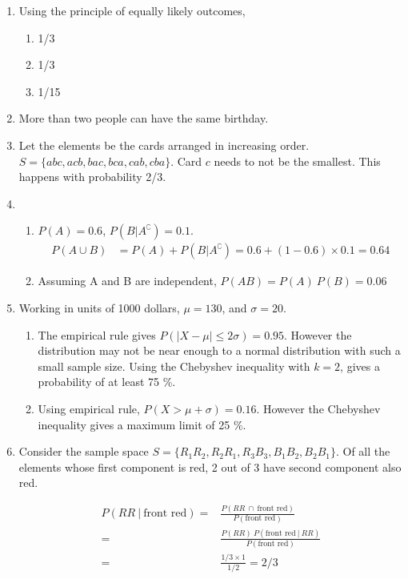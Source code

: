 \begin{enumerate}
	\item Using the principle of equally likely outcomes, 
	\begin{enumerate}
		\item 1/3 
		\item 1/3 
		\item 1/15
	\end{enumerate}
	
	\item More than two people can have the same birthday.
	
	\item Let the elements be the cards arranged in increasing order.
	$ S = \{ abc, acb, bac, bca, cab, cba \} $. Card $ c $ needs to not be the smallest. This happens with probability 2/3.
	
	\item \begin{enumerate}
		\item 	$ P(A) = 0.6 $, $ P(B|A^\complement) = 0.1 $.
		\begin{align}
			P(A \cup B) &= P(A) + P(B|A^\complement) = 0.6 + (1 - 0.6) \times 0.1 = 0.64
		\end{align}
		
		\item Assuming A and B are independent, $ P(AB) = P(A)\ P(B) = 0.06$ \\
	\end{enumerate}
	
	\item Working in units of 1000 dollars, $ \mu = 130 $, and $ \sigma = 20 $. 
	\begin{enumerate}
		\item The empirical rule gives $ P(|X - \mu| \leq 2 \sigma) =  0.95$. However the distribution may not be near enough to a normal distribution with such a small sample size. Using the Chebyshev inequality with $ k = 2 $, gives a probability of at least 75 \%.
		
		\item Using empirical rule, $ P(X > \mu + \sigma) = 0.16 $. However the Chebyshev inequality gives a maximum limit of 25 \%.
	\end{enumerate} 
	
	\item Consider the sample space $S = \{ R_1 R_2, R_2 R_1, R_3 B_3, B_1 B_2, B_2 B_1 \} $. Of all the elements whose first component is red, 2 out of 3 have second component also red.
	
		\begin{align}
			P(RR\ |\ \text{front red}) =& \frac{P(RR \ \cap \  \text{front red})}{P(\text{front red})} \\
			=& \frac{P(RR) \ P(\text{front red}\ |\ RR)}{P(\text{front red})} \\
			=& \frac{1/3 \times 1}{1/2} = 2/3
		\end{align}
	 \\
	

\end{enumerate}
